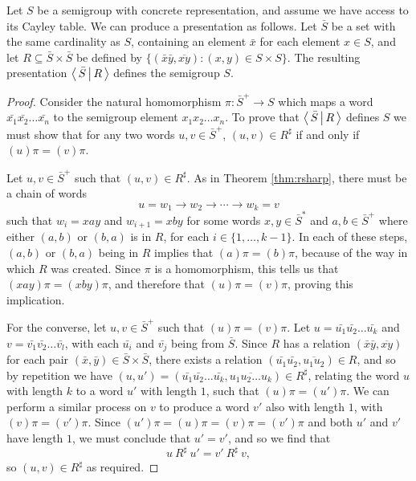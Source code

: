 \begin{method}
  \label{meth:trivial-presentation}
  Let $S$ be a semigroup with concrete representation, and assume we have access to its Cayley
  table.  We can produce a presentation as follows.  Let $\bar S$ be a set with
  the same cardinality as $S$, containing an element $\bar{x}$ for each element
  $x \in S$, and let $R \subseteq \bar{S} \times \bar{S}$ be defined by
  $\{(\bar{x}\bar{y}, \overline{xy}) : (x,y) \in S \times S\}.$ The resulting
  presentation $\left\langle \, \bar{S} \, \middle| \, R \, \right\rangle$ defines the semigroup $S$.

  \begin{proof}
    Consider the natural homomorphism $\pi: \bar{S}^+ \to S$ which maps a word
    $\bar{x_1}\bar{x_2}\ldots \bar{x_n}$ to the semigroup element
    $x_1 x_2\ldots x_n$.  To prove that $\left\langle \, \bar{S} \, \middle| \, R \, \right\rangle$ defines $S$ we must
    show that for any two words $u, v \in \bar{S}^+$, $(u, v) \in R^\sharp$ if
    and only if $(u)\pi = (v)\pi$.

    Let $u,v \in \bar{S}^+$ such that $(u, v) \in R^\sharp$.  As in Theorem
    \ref{thm:rsharp}, there must be a chain of words
    $$u = w_1 \to w_2 \to \cdots \to w_k = v$$
    such that $w_i = xay$ and $w_{i+1} = xby$ for some words $x,y \in \bar{S}^*$ and
    $a,b \in \bar{S}^+$ where either $(a,b)$ or $(b,a)$ is in $R$, for each
    $i \in \{1, \ldots, k-1\}$.  In each of these steps, $(a,b)$ or $(b,a)$
    being in $R$ implies that $(a)\pi = (b)\pi$, because of the way in which $R$
    was created.  Since $\pi$ is a homomorphism, this tells us that
    $(xay)\pi = (xby)\pi$, and therefore that $(u)\pi = (v)\pi$, proving this
    implication.

    For the converse, let $u,v \in \bar{S}^+$ such that $(u)\pi = (v)\pi$.  Let
    $u = \bar{u_1}\bar{u_2}\ldots \bar{u_k}$ and $v = \bar{v_1}\bar{v_2}\ldots \bar{v_l}$, with each $\bar{u_i}$ and $\bar{v_j}$
    being from $\bar{S}$.  Since $R$ has a relation $(\bar{x}\bar{y}, \overline{xy})$ for each
    pair $(\bar{x},\bar{y}) \in \bar{S} \times \bar{S}$, there exists a relation
    $(\bar{u_1}\bar{u_2}, \overline{u_1u_2}) \in R$, and so by repetition we have
    $(u, u') = (\bar{u_1}\bar{u_2}\ldots \bar{u_k}, \overline{u_1u_2\ldots u_k}) \in R^\sharp$, relating the
    word $u$ with length $k$ to a word $u'$ with length $1$, such that
    $(u)\pi = (u')\pi$.  We can perform
    a similar process on $v$ to produce a word $v'$ also with length $1$, with
    $(v)\pi = (v')\pi$.
    Since $(u')\pi = (u)\pi = (v)\pi = (v')\pi$ and both $u'$ and $v'$
    have length $1$, we must conclude that $u' = v'$, and so we
    find that
    $$u ~R^\sharp~ u' = v' ~R^\sharp~ v,$$
    so $(u,v) \in R^\sharp$ as required.
  \end{proof}
\end{method}

